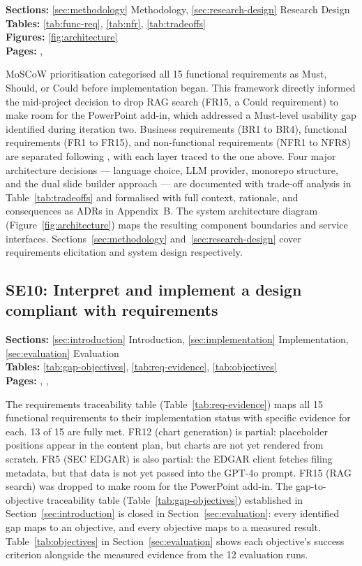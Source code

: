 \noindent\textbf{Sections:} \ref{sec:methodology} Methodology, \ref{sec:research-design} Research Design\\
\noindent\textbf{Tables:} \ref{tab:func-req}, \ref{tab:nfr}, \ref{tab:tradeoffs}\\
\noindent\textbf{Figures:} \ref{fig:architecture}\\
\noindent\textbf{Pages:} \pageref{sec:methodology}, \pageref{sec:research-design}

MoSCoW prioritisation categorised all 15 functional requirements as Must, Should, or Could before implementation began. This framework directly informed the mid-project decision to drop RAG search (FR15, a Could requirement) to make room for the PowerPoint add-in, which addressed a Must-level usability gap identified during iteration two. Business requirements (BR1 to BR4), functional requirements (FR1 to FR15), and non-functional requirements (NFR1 to NFR8) are separated following \textcite{robertson2012}, with each layer traced to the one above. Four major architecture decisions — language choice, LLM provider, monorepo structure, and the dual slide builder approach — are documented with trade-off analysis in Table~\ref{tab:tradeoffs} and formalised with full context, rationale, and consequences as ADRs in Appendix~B. The system architecture diagram (Figure~\ref{fig:architecture}) maps the resulting component boundaries and service interfaces. Sections~\ref{sec:methodology} and~\ref{sec:research-design} cover requirements elicitation and system design respectively.

\subsection*{SE10: Interpret and implement a design compliant with requirements}

\noindent\textbf{Sections:} \ref{sec:introduction} Introduction, \ref{sec:implementation} Implementation, \ref{sec:evaluation} Evaluation\\
\noindent\textbf{Tables:} \ref{tab:gap-objectives}, \ref{tab:req-evidence}, \ref{tab:objectives}\\
\noindent\textbf{Pages:} \pageref{sec:introduction}, \pageref{sec:implementation}, \pageref{sec:evaluation}

The requirements traceability table (Table~\ref{tab:req-evidence}) maps all 15 functional requirements to their implementation status with specific evidence for each. 13 of 15 are fully met. FR12 (chart generation) is partial: placeholder positions appear in the content plan, but charts are not yet rendered from scratch. FR5 (SEC EDGAR) is also partial: the EDGAR client fetches filing metadata, but that data is not yet passed into the GPT-4o prompt. FR15 (RAG search) was dropped to make room for the PowerPoint add-in. The gap-to-objective traceability table (Table~\ref{tab:gap-objectives}) established in Section~\ref{sec:introduction} is closed in Section~\ref{sec:evaluation}: every identified gap maps to an objective, and every objective maps to a measured result. Table~\ref{tab:objectives} in Section~\ref{sec:evaluation} shows each objective's success criterion alongside the measured evidence from the 12 evaluation runs.

